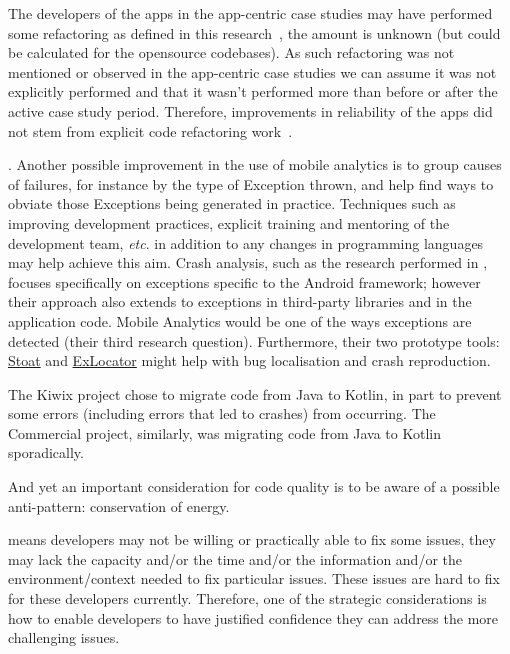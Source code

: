 The developers of the apps in the app-centric case studies may have performed some refactoring as defined in this research~, the amount is unknown (but could be calculated for the opensource codebases). As such refactoring was not mentioned or observed in the app-centric case studies we can assume it was not explicitly performed and that it wasn't performed more than before or after the active case study period. Therefore, improvements in reliability of the apps did not stem from explicit code refactoring work~.

. 
Another possible improvement in the use of mobile analytics is to group causes of failures, for instance by the type of Exception thrown, and help find ways to obviate those Exceptions being generated in practice. Techniques such as improving development practices, explicit training and mentoring of the development team, \emph{etc}. in addition to any changes in programming languages may help achieve this aim. %
Crash analysis, such as the research performed in , focuses specifically on exceptions specific to the Android framework; however their approach also extends to exceptions in third-party libraries and in the application code. Mobile Analytics would be one of the ways exceptions are detected (their third research question). Furthermore, their two prototype tools: \href{https://github.com/tingsu/Stoat}{Stoat} and \href{https://github.com/crashanalysis/ExLocator}{ExLocator} might help with bug localisation and crash reproduction.

The Kiwix project chose to migrate code from Java to Kotlin, in part to prevent some errors (including errors that led to crashes) from occurring. The Commercial project, similarly, was migrating code from Java to Kotlin sporadically.


And yet an important consideration for code quality is to be aware of a possible anti-pattern: conservation of energy.

means developers may not be willing or practically able to fix some issues, they may lack the capacity and/or the time and/or the information and/or the environment/context needed to fix particular issues. These issues are hard to fix for these developers currently.
%
Therefore, one of the strategic considerations is how to enable developers to have justified confidence they can address the more challenging issues.

